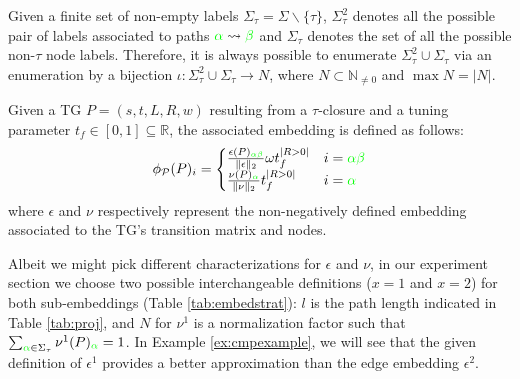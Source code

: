 \begin{definition}[TG Embedding]\label{def:ppne}
Given a finite set of non-empty labels $\Sigma_\tau =\Sigma\backslash\{\tau\}$, $\Sigma_\tau^2$ denotes all the possible pair of labels associated to paths ${\color{green}\alpha}\rightsquigarrow{\color{green}\beta}$ and $\Sigma_\tau$ denotes the set of all the possible non-$\tau$ node labels. Therefore, it is always possible to enumerate $\Sigma_\tau^2\cup\Sigma_\tau$ via an enumeration by a bijection $\iota\colon \Sigma_\tau^2\cup\Sigma_\tau\to  N$, where $N\subset \mathbb{N}_{\neq 0}$ and $\max N=|N|$.
	
Given a TG $P=(s,t,L,R,w)$ resulting from a $\tau$-closure and a tuning parameter $t_f\in[0,1]\subseteq\mathbb{R}$, the associated embedding is defined as follows:
$$\phi_{\mathcal{P}}(P)_i=\begin{cases}
	\frac{\epsilon(P)_{\color{green}\alpha\beta}}{\|\epsilon\|_2}\omega t_f^{|R>0|} & i={\color{green}\alpha\beta}\\
	\frac{\nu(P)_{\color{green}\alpha}}{\|\nu\|_2}t_f^{|R>0|} & i={\color{green}\alpha}\\
\end{cases}$$
where $\epsilon$ and $\nu$ respectively represent the non-negatively defined embedding associated to the TG's transition matrix and nodes.
\end{definition}

Albeit we might pick different characterizations for $\epsilon$ and $\nu$, {in our experiment section} we choose two possible interchangeable definitions ($x=1$ and $x=2$) for both sub-embeddings (Table \ref{tab:embedstrat}): $l$ is the path length indicated in Table \ref{tab:proj}, and $N$ for $\nu^1$ is a normalization factor such that $\sum_{{\color{green}\alpha}\in\Sigma_\tau}\nu^1(P)_{\color{green}\alpha}=1$. In Example \ref{ex:cmpexample}, we will see that the given definition of $\epsilon^1$ provides a better approximation than the edge embedding $\epsilon^2$.


